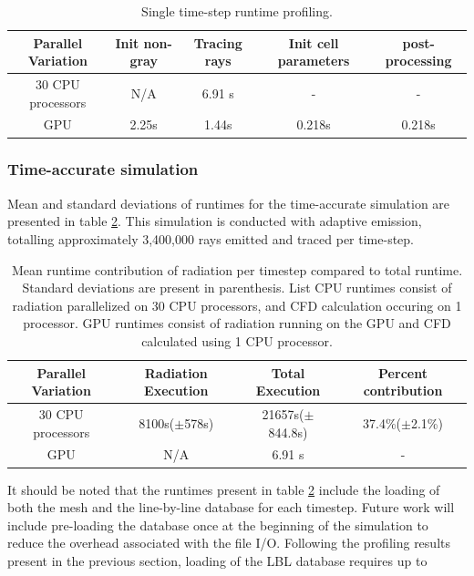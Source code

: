 \begin{table}[h!]
\centering
\begin{tabular}{||c c c c c||} 
 \hline
 Parallel Variation & Init non-gray & Tracing rays & Init cell parameters & post-processing \\ [0.5ex] 
 \hline\hline
 30 CPU processors & N/A & 6.91 s & - & - \\
 GPU & 2.25s & 1.44s & 0.218s & 0.218s\\ 
 \hline
\end{tabular}
\caption{Single time-step runtime profiling.}
\label{table:PoolFireTransient_runtime_table_1rpc}
\end{table}

\subsubsection{Time-accurate simulation}
Mean and standard deviations of runtimes for the time-accurate simulation are presented in table \ref{table:PoolFireTransient_runtime_table_1rpc}. This simulation is conducted with adaptive emission, totalling approximately 3,400,000 rays emitted and traced per time-step.


\begin{table}[h!]
\centering
\begin{tabular}{||c c c c||} 
 \hline
 Parallel Variation & Radiation Execution & Total Execution & Percent contribution \\ [0.5ex] 
 \hline\hline
 30 CPU processors & 8100s($\pm{}$578s) & 21657s($\pm{}$844.8s) & 37.4\%($\pm{}$2.1\%) \\ 
 GPU & N/A & 6.91 s & - \\
 \hline
\end{tabular}
\caption{Mean runtime contribution of radiation per timestep compared to total runtime. Standard deviations are present in parenthesis. List CPU runtimes consist of radiation parallelized on 30 CPU processors, and CFD calculation occuring on 1 processor. GPU runtimes consist of radiation running on the GPU and CFD calculated using 1 CPU processor.}
\label{table:PoolFireTransient_runtime_table_1rpc}
\end{table}

It should be noted that the runtimes present in table \ref{table:PoolFireTransient_runtime_table_1rpc} include the loading of both the mesh and the line-by-line database for each timestep. Future work will include pre-loading the database once at the beginning of the simulation to reduce the overhead associated with the file I/O.
Following the profiling results present in the previous section, loading of the LBL database requires up to 


